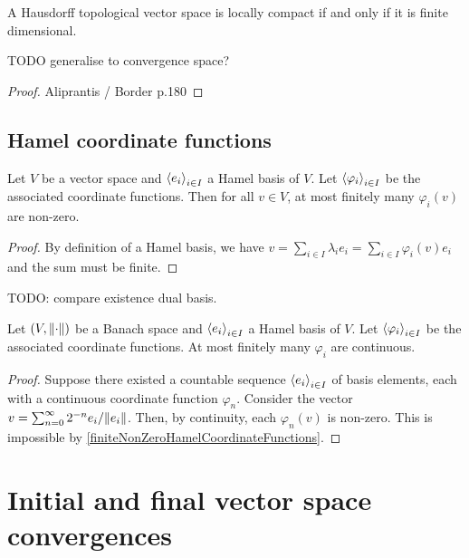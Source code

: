 \begin{proposition}
A Hausdorff topological vector space is locally compact if and only if it is finite dimensional.
\end{proposition}
TODO generalise to convergence space?
\begin{proof}
Aliprantis / Border p.180
\end{proof}

\subsection{Hamel coordinate functions}
\begin{lemma} \label{finiteNonZeroHamelCoordinateFunctions}
Let $V$ be a vector space and $\left\langle e_i \right\rangle_{i\in I}$ a Hamel basis of $V$. Let $\left\langle \varphi_i \right\rangle_{i\in I}$ be the associated coordinate functions. Then for all $v\in V$, at most finitely many $\varphi_i(v)$ are non-zero.
\end{lemma}
\begin{proof}
By definition of a Hamel basis, we have $v = \sum_{i\in I}\lambda_i e_i = \sum_{i\in I}\varphi_i(v) e_i$ and the sum must be finite.
\end{proof}
TODO: compare existence dual basis.

\begin{proposition}
Let $\sSet{V,\norm{\cdot}}$ be a Banach space and $\left\langle e_i \right\rangle_{i\in I}$ a Hamel basis of $V$. Let $\left\langle \varphi_i \right\rangle_{i\in I}$ be the associated coordinate functions. At most finitely many $\varphi_i$ are continuous.
\end{proposition}
\begin{proof}
Suppose there existed a countable sequence $\left\langle e_i \right\rangle_{i\in I}$ of basis elements, each with a continuous coordinate function $\varphi_n$. Consider the vector $v = \sum_{n=0}^\infty 2^{-n}e_i/\lVert e_i\rVert$. Then, by continuity, each $\varphi_n(v)$ is non-zero. This is impossible by \ref{finiteNonZeroHamelCoordinateFunctions}.
\end{proof}


\section{Initial and final vector space convergences}
